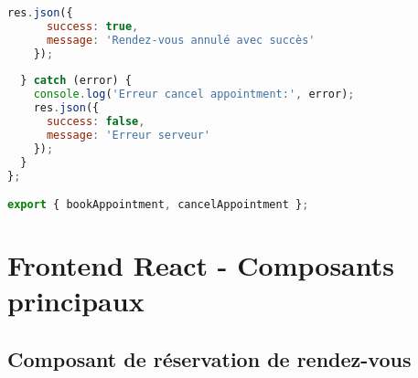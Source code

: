 \begin{lstlisting}[language=JavaScript, caption=appointmentController.js - Gestion complète des rendez-vous]
    res.json({
      success: true,
      message: 'Rendez-vous annulé avec succès'
    });
    
  } catch (error) {
    console.log('Erreur cancel appointment:', error);
    res.json({
      success: false,
      message: 'Erreur serveur'
    });
  }
};

export { bookAppointment, cancelAppointment };
\end{lstlisting}

\section{Frontend React - Composants principaux}

\subsection{Composant de réservation de rendez-vous}


